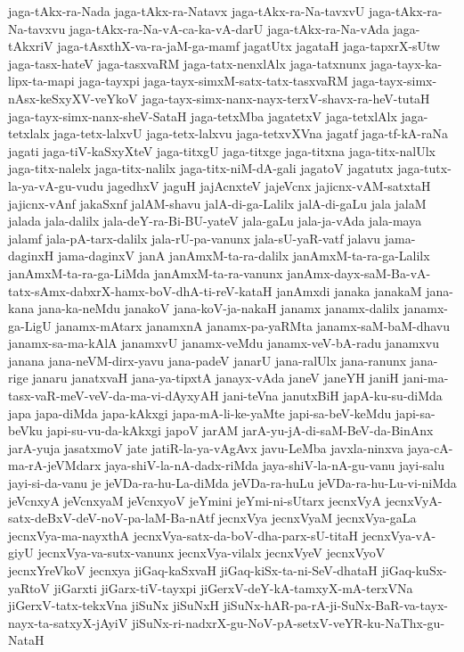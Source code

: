 {jaga-tAkx-ra-Nada
jaga-tAkx-ra-Natavx
jaga-tAkx-ra-Na-tavxvU
jaga-tAkx-ra-Na-tavxvu
jaga-tAkx-ra-Na-vA-ca-ka-vA-darU
jaga-tAkx-ra-Na-vAda
jaga-tAkxriV
jaga-tAsxthX-va-ra-jaM-ga-mamf
jagatUtx
jagataH
jaga-tapxrX-sUtw
jaga-tasx-hateV
jaga-tasxvaRM
jaga-tatx-nenxlAlx
jaga-tatxnunx
jaga-tayx-ka-lipx-ta-mapi
jaga-tayxpi
jaga-tayx-simxM-satx-tatx-tasxvaRM
jaga-tayx-simx-nAsx-keSxyXV-veYkoV
jaga-tayx-simx-nanx-nayx-terxV-shavx-ra-heV-tutaH
jaga-tayx-simx-nanx-sheV-SataH
jaga-tetxMba
jagatetxV
jaga-tetxlAlx
jaga-tetxlalx
jaga-tetx-lalxvU
jaga-tetx-lalxvu
jaga-tetxvXVna
jagatf
jaga-tf-kA-raNa
jagati
jaga-tiV-kaSxyXteV
jaga-titxgU
jaga-titxge
jaga-titxna
jaga-titx-nalUlx
jaga-titx-nalelx
jaga-titx-nalilx
jaga-titx-niM-dA-gali
jagatoV
jagatutx
jaga-tutx-la-ya-vA-gu-vudu
jagedhxV
jaguH
jajAcnxteV
jajeVcnx
jajicnx-vAM-satxtaH
jajicnx-vAnf
jakaSxnf
jalAM-shavu
jalA-di-ga-Lalilx
jalA-di-gaLu
jala
jalaM
jalada
jala-dalilx
jala-deY-ra-Bi-BU-yateV
jala-gaLu
jala-ja-vAda
jala-maya
jalamf
jala-pA-tarx-dalilx
jala-rU-pa-vanunx
jala-sU-yaR-vatf
jalavu
jama-daginxH
jama-daginxV
janA
janAmxM-ta-ra-dalilx
janAmxM-ta-ra-ga-Lalilx
janAmxM-ta-ra-ga-LiMda
janAmxM-ta-ra-vanunx
janAmx-dayx-saM-Ba-vA-tatx-sAmx-dabxrX-hamx-boV-dhA-ti-reV-kataH
janAmxdi
janaka
janakaM
jana-kana
jana-ka-neMdu
janakoV
jana-koV-ja-nakaH
janamx
janamx-dalilx
janamx-ga-LigU
janamx-mAtarx
janamxnA
janamx-pa-yaRMta
janamx-saM-baM-dhavu
janamx-sa-ma-kAlA
janamxvU
janamx-veMdu
janamx-veV-bA-radu
janamxvu
janana
jana-neVM-dirx-yavu
jana-padeV
janarU
jana-ralUlx
jana-ranunx
jana-rige
janaru
janatxvaH
jana-ya-tipxtA
janayx-vAda
janeV
janeYH
janiH
jani-ma-tasx-vaR-meV-veV-da-ma-vi-dAyxyAH
jani-teVna
janutxBiH
japA-ku-su-diMda
japa
japa-diMda
japa-kAkxgi
japa-mA-li-ke-yaMte
japi-sa-beV-keMdu
japi-sa-beVku
japi-su-vu-da-kAkxgi
japoV
jarAM
jarA-yu-jA-di-saM-BeV-da-BinAnx
jarA-yuja
jasatxmoV
jate
jatiR-la-ya-vAgAvx
javu-LeMba
javxla-ninxva
jaya-cA-ma-rA-jeVMdarx
jaya-shiV-la-nA-dadx-riMda
jaya-shiV-la-nA-gu-vanu
jayi-salu
jayi-si-da-vanu
je
jeVDa-ra-hu-La-diMda
jeVDa-ra-huLu
jeVDa-ra-hu-Lu-vi-niMda
jeVcnxyA
jeVcnxyaM
jeVcnxyoV
jeYmini
jeYmi-ni-sUtarx
jecnxVyA
jecnxVyA-satx-deBxV-deV-noV-pa-laM-Ba-nAtf
jecnxVya
jecnxVyaM
jecnxVya-gaLa
jecnxVya-ma-nayxthA
jecnxVya-satx-da-boV-dha-parx-sU-titaH
jecnxVya-vA-giyU
jecnxVya-va-sutx-vanunx
jecnxVya-vilalx
jecnxVyeV
jecnxVyoV
jecnxYreVkoV
jecnxya
jiGaq-kaSxvaH
jiGaq-kiSx-ta-ni-SeV-dhataH
jiGaq-kuSx-yaRtoV
jiGarxti
jiGarx-tiV-tayxpi
jiGerxV-deY-kA-tamxyX-mA-terxVNa
jiGerxV-tatx-tekxVna
jiSuNx
jiSuNxH
jiSuNx-hAR-pa-rA-ji-SuNx-BaR-va-tayx-nayx-ta-satxyX-jAyiV
jiSuNx-ri-nadxrX-gu-NoV-pA-setxV-veYR-ku-NaThx-gu-NataH
}
